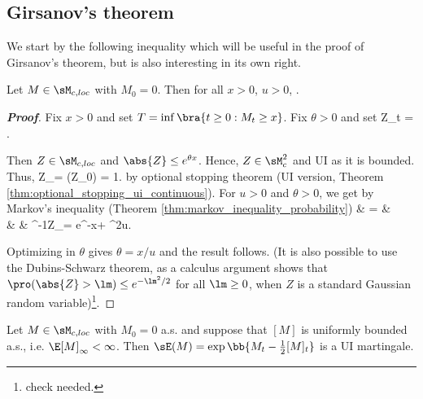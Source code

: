 \subsection{Girsanov's theorem}

We start by the following inequality which will be useful in the proof of Girsanov's theorem, but is also interesting in its own right.

\begin{proposition}\label{pro:exponential_martingale_inequality}
Let $M \in \sM_{c,loc}$ with $M_0 = 0$. Then for all $x > 0$, $u > 0$,
\be
\pro{} \leq \exp{}.
\ee
\end{proposition}
%
\begin{proof}[\bf Proof]
Fix $x > 0$ and set $T = \inf\bra{t \geq 0 : M_t \geq x}$. Fix $\theta > 0$ and set
\be
Z_t = \exp{}.
\ee

Then $Z \in\sM_{c,loc}$ and $\abs{Z} \leq e^{\theta x}$. Hence, $Z \in \sM^2_c$ and UI as it is bounded. Thus, %
\be
\E Z_\infty = \E(Z_0) = 1.
\ee
by optional stopping theorem (UI version, Theorem \ref{thm:optional_stopping_ui_continuous}). For $u > 0$ and $\theta >0$, we get by Markov's inequality (Theorem \ref{thm:markov_inequality_probability})
\beast
\pro{} & = & \pro{} \leq  \pro{} \\
& \leq & \pro{} \leq {}^{-1}\E Z_\infty = e^{-\theta x+ \theta^2u}.
\eeast

Optimizing in $\theta$  gives $\theta = x/u$ and the result follows. (It is also possible to use the Dubins-Schwarz theorem, as a calculus argument shows that $\pro(\abs{Z} > \lm) \leq e^{-\lm^2/2}$ for all $\lm \geq 0$, when $Z$ is a standard Gaussian random variable)\footnote{check needed.}.
\end{proof}


\begin{proposition}\label{pro:exponential_ui_martingale}
Let $M \in \sM_{c,loc}$ with $M_0 = 0$ a.s. and suppose that $[M]$ is uniformly bounded a.s., i.e. $\E[M]_\infty < \infty$. Then $\sE(M) = \exp\bb{M_t - \frac 12 [M]_t}$ is a UI martingale.
\end{proposition}

